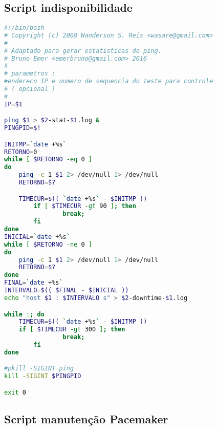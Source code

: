 
\chapter{}
\label{cap:apscripts}

\section{Script indisponibilidade}
\label{ap:scriptindisp}

\begin{lstlisting}[language=bash]
#!/bin/bash
# Copyright (c) 2008 Wanderson S. Reis <wasare@gmail.com>
#
# Adaptado para gerar estatisticas do ping.
# Bruno Emer <emerbruno@gmail.com> 2016
#
# parametros :
#endereco IP e numero de sequencia do teste para controle
# ( opcional )
#
IP=$1

ping $1 > $2-stat-$1.log &
PINGPID=$!

INITMP=`date +%s`
RETORNO=0
while [ $RETORNO -eq 0 ]
do
	ping -c 1 $1 2> /dev/null 1> /dev/null
	RETORNO=$?

	TIMECUR=$(( `date +%s` - $INITMP ))
        if [ $TIMECUR -gt 90 ]; then
                break;
        fi
done
INICIAL=`date +%s`
while [ $RETORNO -ne 0 ]
do
	ping -c 1 $1 2> /dev/null 1> /dev/null
	RETORNO=$?
done
FINAL=`date +%s`
INTERVALO=$(( $FINAL - $INICIAL ))
echo "host $1 : $INTERVALO s" > $2-downtime-$1.log

while :; do
	TIMECUR=$(( `date +%s` - $INITMP ))
	if [ $TIMECUR -gt 300 ]; then
                break;
        fi
done

#pkill -SIGINT ping
kill -SIGINT $PINGPID

exit 0
\end{lstlisting}


\section{Script manutenção Pacemaker}
\label{ap:scriptmanutencao}

